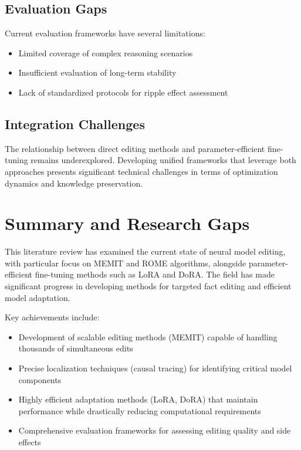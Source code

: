 \subsection{Evaluation Gaps}

Current evaluation frameworks have several limitations:
\begin{itemize}
    \item Limited coverage of complex reasoning scenarios
    \item Insufficient evaluation of long-term stability
    \item Lack of standardized protocols for ripple effect assessment
\end{itemize}

\subsection{Integration Challenges}

The relationship between direct editing methods and parameter-efficient fine-tuning remains underexplored. Developing unified frameworks that leverage both approaches presents significant technical challenges in terms of optimization dynamics and knowledge preservation.

\section{Summary and Research Gaps}

This literature review has examined the current state of neural model editing, with particular focus on MEMIT and ROME algorithms, alongside parameter-efficient fine-tuning methods such as LoRA and DoRA. The field has made significant progress in developing methods for targeted fact editing and efficient model adaptation.

Key achievements include:
\begin{itemize}
    \item Development of scalable editing methods (MEMIT) capable of handling thousands of simultaneous edits
    \item Precise localization techniques (causal tracing) for identifying critical model components
    \item Highly efficient adaptation methods (LoRA, DoRA) that maintain performance while drastically reducing computational requirements
    \item Comprehensive evaluation frameworks for assessing editing quality and side effects
\end{itemize}


